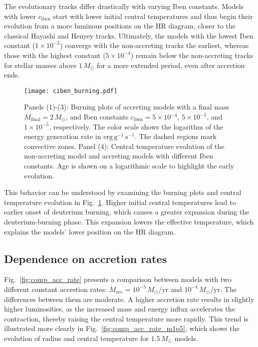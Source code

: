 \documentclass[12pt,a4paper]{article}
\newcommand{\mr}{\mathrm}
\begin{document}
The evolutionary tracks differ drastically with varying Iben constants. Models with lower $c_\mr{iben}$ start with lower initial central temperatures and thus begin their evolution from a more luminous positions on the HR diagram, closer to the classical Hayashi and Henyey tracks. Ultimately, the models with the lowest Iben constant ($1 \times 10^{-5}$) converge with the non-accreting tracks the earliest, whereas those with the highest constant ($5 \times 10^{-4}$) remain below the non-accreting tracks for stellar masses above $1\,M_\odot$ for a more extended period, even after accretion ends.

\begin{figure}[htbp]
  \centering
  \texttt{[image: ciben\_burning.pdf]}
  \caption{Panels (1)-(3): Burning plots of accreting models with a final mass $M_\mr{final} = 2\,M_\odot$, and Iben constants $c_\mr{iben} =  5\times10^{-4}$, $5\times10^{-5}$, and $1\times10^{-5}$, respectively. The color scale shows the logarithm of the energy generation rate in $\mr{erg\,g^{-1}\,s^{-1}}$. The dashed regions mark convective zones. Panel (4): Central temperature evolution of the non-accreting model and accreting models with different Iben constants. Age is shown on a logarithmic scale to highlight the early evolution.}
  \label{fig:comp_iben_burning}
\end{figure}

This behavior can be understood by examining the burning plots and central temperature evolution in Fig.~\ref{fig:comp_iben_burning}. Higher initial central temperatures lead to earlier onset of deuterium burning, which causes a greater expansion during the deuterium-burning phase. This expansion lowers the effective temperature, which explains the models' lower position on the HR diagram.

\subsection{Dependence on accretion rates}
\label{sec:accretion_rate}

Fig.~\ref{fig:comp_acc_rate} presents a comparison between models with two different constant accretion rates: $\dot{M}_\mr{acc} = 10^{-5}\,M_\odot/\mr{yr}$ and $10^{-4}\,M_\odot/\mr{yr}$. The differences between them are moderate. A higher accretion rate results in slightly higher luminosities, as the increased mass and energy influx accelerates the contraction, thereby raising the central temperature more rapidly. This trend is illustrated more clearly in Fig.~\ref{fig:comp_acc_rate_m1p5}, which shows the evolution of radius and central temperature for $1.5\,M_\odot$ models. 
\end{document}
